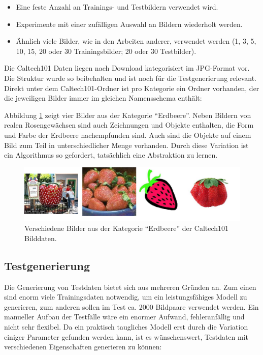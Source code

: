 \begin{itemize}
	\item Eine feste Anzahl an Trainings- und Testbildern verwendet wird.
	\item Experimente mit einer zufälligen Auswahl an Bildern wiederholt werden.
	\item Ähnlich viele Bilder, wie in den Arbeiten anderer, verwendet werden (1, 3, 5, 10, 15, 20 oder 30 Trainingsbilder; 20 oder 30 Testbilder).
\end{itemize}

Die Caltech101 Daten liegen nach Download kategorisiert im JPG-Format vor. Die Struktur wurde so beibehalten und ist noch für die Testgenerierung relevant. Direkt unter dem Caltech101-Ordner ist pro Kategorie ein Ordner vorhanden, der die jeweiligen Bilder immer im gleichen Namensschema enthält:\newline


Abbildung \ref{img:strawberries} zeigt vier Bilder aus der Kategorie \enquote{Erdbeere}. Neben Bildern von realen Rosengewächsen sind auch Zeichnungen und Objekte enthalten, die Form und Farbe der Erdbeere nachempfunden sind. Auch sind die Objekte auf einem Bild zum Teil in unterschiedlicher Menge vorhanden. Durch diese Variation ist ein Algorithmus so gefordert, tatsächlich eine Abstraktion zu lernen.

\begin{figure}[!htb]
	\centering
	\includegraphics[scale=0.5]{images/strawberry.png}
	\caption{Verschiedene Bilder aus der Kategorie \enquote{Erdbeere} der Caltech101 Bilddaten.}
	\label{img:strawberries}
\end{figure}

\subsection{Testgenerierung}

Die Generierung von Testdaten bietet sich aus mehreren Gründen an. Zum einen sind enorm viele Trainingsdaten notwendig, um ein leistungsfähiges Modell zu generieren, zum anderen sollen im Test ca. 2000 Bildpaare verwendet werden. Ein manueller Aufbau der Testfälle wäre ein enormer Aufwand, fehleranfällig und nicht sehr flexibel. Da ein praktisch taugliches Modell erst durch die Variation einiger Parameter gefunden werden kann, ist es wünschenswert, Testdaten mit verschiedenen Eigenschaften generieren zu können:

